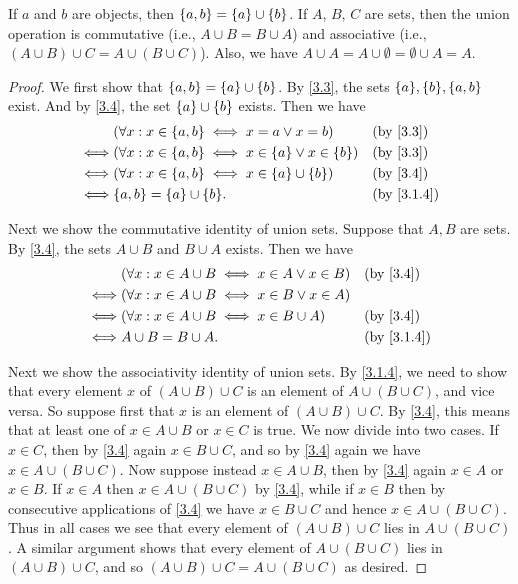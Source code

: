 \begin{lem}\label{3.1.13}
  If \(a\) and \(b\) are objects, then \(\left\lbrace a, b\right\rbrace = \left\lbrace a\right\rbrace \cup \left\lbrace b\right\rbrace\).
  If \(A\), \(B\), \(C\) are sets, then the union operation is commutative (i.e., \(A \cup B = B \cup A\)) and associative (i.e., \((A \cup B) \cup C = A \cup (B \cup C)\)).
  Also, we have \(A \cup A = A \cup \emptyset = \emptyset \cup A = A\).
\end{lem}

\begin{proof}
  We first show that \(\left\lbrace a, b\right\rbrace = \left\lbrace a\right\rbrace \cup \left\lbrace b\right\rbrace\).
  By \cref{3.3}, the sets \(\set{a}, \set{b}, \set{a, b}\) exist.
  And by \cref{3.4}, the set \(\left\lbrace a\right\rbrace \cup \left\lbrace b\right\rbrace\) exists.
  Then we have
  \begin{align*}
         & (\forall x : x \in \set{a, b} \iff x = a \lor x = b)                 &  & \by{3.3}   \\
    \iff & (\forall x : x \in \set{a, b} \iff x \in \set{a} \lor x \in \set{b}) &  & \by{3.3}   \\
    \iff & (\forall x : x \in \set{a, b} \iff x \in \set{a} \cup \set{b})       &  & \by{3.4}   \\
    \iff & \set{a, b} = \set{a} \cup \set{b}.                                   &  & \by{3.1.4}
  \end{align*}

  Next we show the commutative identity of union sets.
  Suppose that \(A, B\) are sets.
  By \cref{3.4}, the sets \(A \cup B\) and \(B \cup A\) exists.
  Then we have
  \begin{align*}
         & (\forall x : x \in A \cup B \iff x \in A \lor x \in B) &  & \by{3.4}   \\
    \iff & (\forall x : x \in A \cup B \iff x \in B \lor x \in A)                 \\
    \iff & (\forall x : x \in A \cup B \iff x \in B \cup A)       &  & \by{3.4}   \\
    \iff & A \cup B = B \cup A.                                   &  & \by{3.1.4}
  \end{align*}

  Next we show the associativity identity of union sets.
  By \cref{3.1.4}, we need to show that every element \(x\) of \((A \cup B) \cup C\) is an element of \(A \cup (B \cup C)\), and vice versa.
  So suppose first that \(x\) is an element of \((A \cup B) \cup C\).
  By \cref{3.4}, this means that at least one of \(x \in A \cup B\) or \(x \in C\) is true.
  We now divide into two cases.
  If \(x \in C\), then by \cref{3.4} again \(x \in B \cup C\), and so by \cref{3.4} again we have \(x \in A \cup (B \cup C)\).
  Now suppose instead \(x \in A \cup B\), then by \cref{3.4} again \(x \in A\) or \(x \in B\).
  If \(x \in A\) then \(x \in A \cup (B \cup C)\) by \cref{3.4}, while if \(x \in B\) then by consecutive applications of \cref{3.4} we have \(x \in B \cup C\) and hence \(x \in A \cup (B \cup C)\).
  Thus in all cases we see that every element of \((A \cup B) \cup C\) lies in \(A \cup (B \cup C)\).
  A similar argument shows that every element of \(A \cup (B \cup C)\) lies in \((A \cup B) \cup C\), and so \((A \cup B) \cup C = A \cup (B \cup C) \) as desired.


\end{proof}
